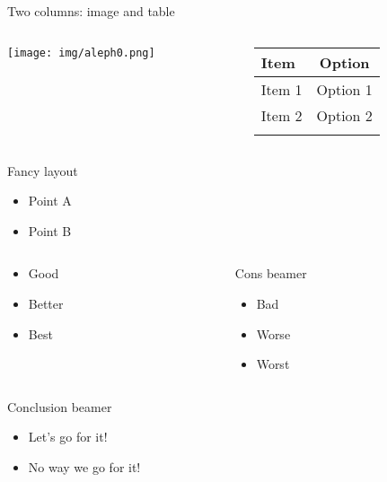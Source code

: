 \documentclass[
  11pt,
  ignorenonframetext,
  aspectratio=169,
  aspectratio=169]{beamer}
\providecommand{\tightlist}{%
  \setlength{\itemsep}{0pt}\setlength{\parskip}{0pt}}
\begin{document}
\begin{frame}{Two columns: image and table}
\label{two-columns-image-and-table}
\begin{columns}[T]
\begin{column}{0.48\textwidth}
\texttt{[image: img/aleph0.png]}
\end{column}

\begin{column}{0.48\textwidth}
\begin{longtable}[]{@{}lc@{}}
\toprule\noalign{}
\textbf{Item} & \textbf{Option} \\
\midrule\noalign{}
\endhead
Item 1 & Option 1 \\
Item 2 & Option 2 \\
\bottomrule\noalign{}
\end{longtable}
\end{column}
\end{columns}
\end{frame}

\begin{frame}{Fancy layout}
\label{fancy-layout}
\begin{itemize}
\tightlist
\item
  Point A
\item
  Point B
\end{itemize}

\begin{columns}[T]
\begin{column}{0.48\textwidth}
\begin{itemize}
\tightlist
\item
  Good
\item
  Better
\item
  Best
\end{itemize}
\end{column}

\begin{column}{0.48\textwidth}
\begin{block}{Cons beamer}
\label{cons-beamer}
\begin{itemize}
\tightlist
\item
  Bad
\item
  Worse
\item
  Worst
\end{itemize}
\end{block}
\end{column}
\end{columns}

\begin{block}{Conclusion beamer}
\label{conclusion-beamer}
\begin{itemize}
\tightlist
\item
  Let's go for it!
\item
  No way we go for it!
\end{itemize}
\end{block}
\end{frame}
\end{document}
